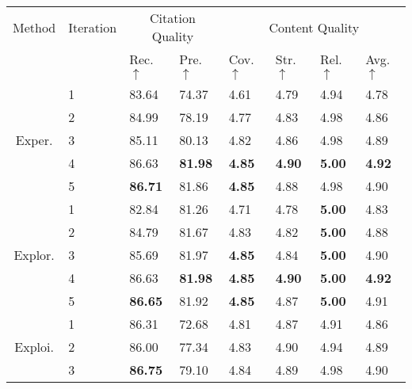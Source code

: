 \documentclass[manuscript,review,anonymous]{acmart}
\begin{document}
\begin{table}[h]
    \centering
        \begin{tabular}{clllllll}
            \toprule
            \multirow{2.5}{*}{Method} & \multirow{2.5}{*}{Iteration} & \multicolumn{2}{c}{Citation Quality} & \multicolumn{4}{c}{Content Quality} \\
            \cmidrule(lr){3-4} \cmidrule(lr){5-8}
            & & Rec. $\uparrow$ & Pre. $\uparrow$ & Cov. $\uparrow$ & Str. $\uparrow$ & Rel. $\uparrow$ & Avg. $\uparrow$ \\
            \midrule
            \multirow{5}{*}{Exper.}
            & 1 & 83.64 & 74.37 & 4.61 & 4.79 & 4.94 & 4.78 \\
            & 2 & 84.99 & 78.19 & 4.77 & 4.83 & 4.98 & 4.86 \\
            & 3 & 85.11 & 80.13 & 4.82 & 4.86 & 4.98 & 4.89 \\
            & \cellcolor{gray!15}4 & \cellcolor{gray!15}86.63 & \cellcolor{gray!15}\textbf{81.98} & \cellcolor{gray!15}\textbf{4.85} & \cellcolor{gray!15}\textbf{4.90} & \cellcolor{gray!15}\textbf{5.00} & \cellcolor{gray!15}\textbf{4.92} \\
            & 5 & \textbf{86.71} & 81.86 & \textbf{4.85} & 4.88 & 4.98 & 4.90 \\
            \midrule
            \multirow{5}{*}{Explor.}
            & 1 & 82.84 & 81.26 & 4.71 & 4.78 & \textbf{5.00} & 4.83 \\
            & 2 & 84.79 & 81.67 & 4.83 & 4.82 & \textbf{5.00} & 4.88 \\
            & 3 & 85.69 & 81.97 & \textbf{4.85} & 4.84 & \textbf{5.00} & 4.90 \\
            & \cellcolor{gray!15}4 & \cellcolor{gray!15}86.63 & \cellcolor{gray!15}\textbf{81.98} & \cellcolor{gray!15}\textbf{4.85} & \cellcolor{gray!15}\textbf{4.90} & \cellcolor{gray!15}\textbf{5.00} & \cellcolor{gray!15}\textbf{4.92} \\
            & 5 & \textbf{86.65} & 81.92 & \textbf{4.85} & 4.87 & \textbf{5.00} & 4.91 \\
            \midrule
            \multirow{5}{*}{Exploi.}
            & 1 & 86.31 & 72.68 & 4.81 & 4.87 & 4.91 & 4.86 \\
            & 2 & 86.00 & 77.34 & 4.83 & 4.90 & 4.94 & 4.89 \\
            & 3 & \textbf{86.75} & 79.10 & 4.84 & 4.89 & 4.98 & 4.90 \\

\end{tabular}
\end{table}
\end{document}
